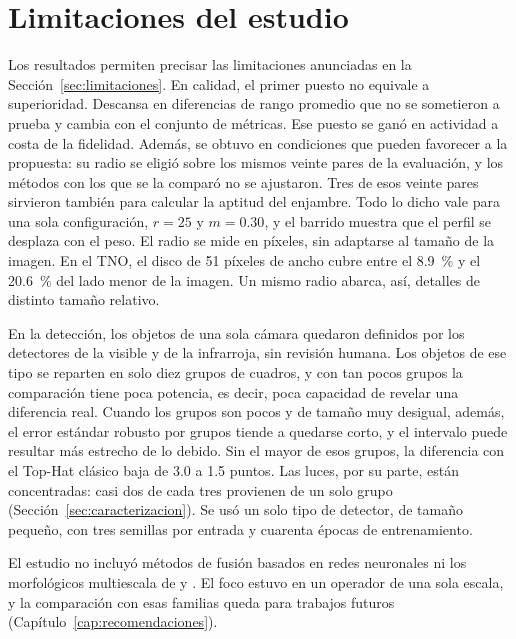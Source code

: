\section{Limitaciones del estudio}
\label{sec:disc-limitaciones}

Los resultados permiten precisar las limitaciones anunciadas en la Sección~\ref{sec:limitaciones}. En
calidad, el primer puesto no equivale a superioridad. Descansa en diferencias de rango promedio que no se
sometieron a prueba y cambia con el conjunto de métricas. Ese puesto se ganó en actividad a costa de la
fidelidad. Además, se obtuvo en condiciones que pueden favorecer a la propuesta: su radio se eligió
sobre los mismos veinte pares de la evaluación, y los métodos con los que se la comparó no se ajustaron.
Tres de esos veinte pares sirvieron también para calcular la aptitud del enjambre. Todo lo
dicho vale para una sola configuración, $r = 25$ y $m = 0.30$, y el barrido muestra que el perfil se
desplaza con el peso. El radio se mide en píxeles, sin adaptarse al tamaño de la imagen. En el TNO, el disco de 51 píxeles de ancho
cubre entre el 8.9~\% y el 20.6~\% del lado menor de la imagen. Un mismo radio abarca, así, detalles
de distinto tamaño relativo.

En la detección, los objetos de una sola cámara quedaron definidos por los detectores de la visible y de
la infrarroja, sin revisión humana. Los objetos de ese tipo se reparten en solo diez grupos de cuadros, y
con tan pocos grupos la comparación tiene poca potencia, es decir, poca capacidad de revelar una diferencia
real. Cuando los grupos son pocos y de tamaño muy desigual, además, el error estándar robusto por grupos tiende a
quedarse corto, y el intervalo puede resultar más estrecho de lo debido. Sin el mayor de esos grupos,
la diferencia con el Top-Hat clásico baja de 3.0 a 1.5 puntos. Las luces, por su parte, están
concentradas: casi dos de cada tres provienen de un solo grupo (Sección~\ref{sec:caracterizacion}). Se usó un solo tipo de detector, de tamaño pequeño, con tres
semillas por entrada y cuarenta épocas de entrenamiento.

El estudio no incluyó métodos de fusión basados en redes neuronales ni los morfológicos multiescala de
\textcite{bai2013} y \textcite{roman2020}. El foco estuvo en un operador de una sola escala, y la
comparación con esas familias queda para trabajos futuros (Capítulo~\ref{cap:recomendaciones}).
